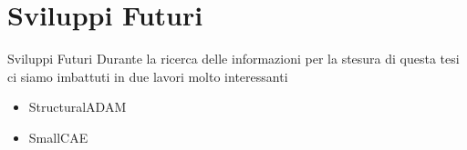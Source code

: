 \section{Sviluppi Futuri}

    \begin{frame}{Sviluppi Futuri}
        Durante la ricerca delle informazioni per la stesura di questa tesi ci siamo imbattuti in due lavori molto interessanti
        \begin{itemize}
            \item StructuralADAM \cite{balle2018efficient}
            \item SmallCAE \cite{yang2021slimmable}
        \end{itemize}
    \end{frame}
    